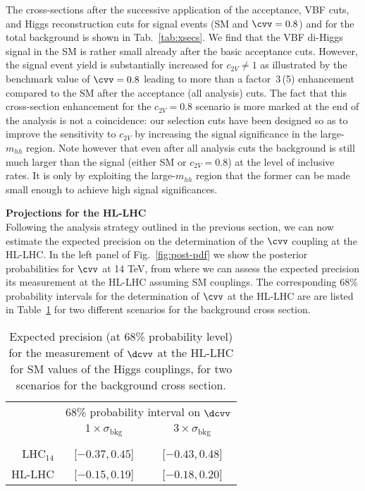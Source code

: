 The cross-sections after the
successive application of the acceptance, VBF cuts, and Higgs reconstruction cuts
for signal events (SM and  $\cvv=0.8$) and for
the total background is shown in Tab.~\ref{tab:xsecs}. We find that the VBF di-Higgs signal in the SM is rather small
already after the basic acceptance cuts. However, the signal event
yield is substantially increased for $c_{2V}\ne 1$ as illustrated by the
benchmark value of $\cvv = 0.8$ leading to more than a factor~3\,(5) enhancement
compared to the SM after the acceptance (all analysis) cuts. The fact that this
cross-section enhancement for the $c_{2V} = 0.8$ scenario is more marked at the
end of the analysis is not a coincidence: our selection cuts have been designed
so as to improve the sensitivity to $c_{2V}$ by increasing the signal
significance in the large-$m_{hh}$ region.
Note however that even after
all analysis cuts the background is still much larger than the signal (either SM
or $c_{2V}=0.8$) at the level of inclusive rates. It is only by exploiting  the
large-$m_{hh}$ region that the former can be made small enough to achieve high
signal significances.

\noindent
{\bf Projections for the HL-LHC}\\
Following the analysis strategy outlined in the previous section,
we can now estimate the expected precision on the 
determination of the $\cvv$ coupling at the HL-LHC.
%
In the left panel of Fig.~\ref{fig:post-pdf} we show the
posterior probabilities for $\cvv$ at 14 TeV,
from where we can assess the expected precision  
its measurement at the HL-LHC assuming SM couplings.
The corresponding 68\% probability intervals for the determination of $\cvv$ at the HL-LHC 
are are listed in Table~\ref{tab:resultsdcvv} for two different 
scenarios for the background cross section.
\begin{table}[h!]
	\begin{center}
		\begin{tabular}{r|@{\hskip 0.15in}c @{\hskip 0.2in}c}
			\toprule[1pt]
			&\multicolumn{2}{c}{68\% probability interval on $\dcvv$}\\[0.1cm]
			& $1\times\sigma_\text{bkg}$&
			$3\times\sigma_\text{bkg}$ \\[0.1cm]
			\hline
			& & \\[-0.3cm]
			LHC$_{14}$ & [$-0.37$,\,$0.45$] & [$-0.43$,\,0.48] \\[0.2cm]
			HL-LHC & [$-0.15$,\,0.19] & [$-0.18$,\,0.20]\\[0.2cm]
			\bottomrule[1pt]
		\end{tabular}
	\end{center}
	\vspace{-0.3cm}
	\caption{\small Expected precision (at 68\% probability level) for
		the measurement of $\dcvv$ at the HL-LHC for
		SM values of the Higgs couplings, for two scenarios for the background cross section.
		\label{tab:resultsdcvv}
	}
\end{table}


